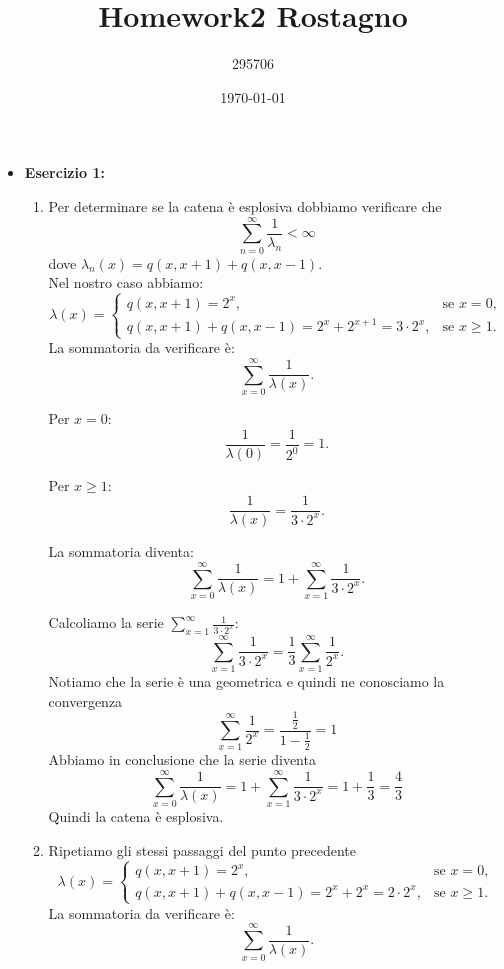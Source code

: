 \documentclass[a4paper,12pt]{article}
\begin{document}
	\title{\textbf{Homework2 Rostagno}}
	\author{295706}
	\date{\today}
	\maketitle
	
	\begin{itemize}
		\item \textbf{Esercizio 1: }
		\begin{enumerate}[label=\alph*)]
			\item Per determinare se la catena è esplosiva dobbiamo verificare che 
			\[
			\sum_{n=0}^\infty \frac{1}{\lambda_n} < \infty
			\]
			dove $\lambda_n(x)=q(x,x+1) + q(x,x-1)$.\\
			Nel nostro caso abbiamo:\\
			\[
			\lambda(x) =
			\begin{cases} 
				q(x, x+1) = 2^x, & \text{se } x = 0, \\ 
				q(x, x+1) + q(x, x-1) = 2^x + 2^{x+1} = 3 \cdot 2^x, & \text{se } x \geq 1.
			\end{cases}
			\]
			La sommatoria da verificare è:
			\[
			\sum_{x=0}^\infty \frac{1}{\lambda(x)}.
			\]
			
			Per \(x = 0\):
			\[
			\frac{1}{\lambda(0)} = \frac{1}{2^0} = 1.
			\]
			
			Per \(x \geq 1\):
			\[
			\frac{1}{\lambda(x)} = \frac{1}{3 \cdot 2^x}.
			\]
			
			La sommatoria diventa:
			\[
			\sum_{x=0}^\infty \frac{1}{\lambda(x)} = 1 + \sum_{x=1}^\infty \frac{1}{3 \cdot 2^x}.
			\]
			
			Calcoliamo la serie \(\sum_{x=1}^\infty \frac{1}{3 \cdot 2^x}\):
			\[
			\sum_{x=1}^\infty \frac{1}{3 \cdot 2^x} = \frac{1}{3} \sum_{x=1}^\infty \frac{1}{2^x}.
			\]
			Notiamo che la serie è una geometrica e quindi ne conosciamo la convergenza\\
			\[
			\sum_{x=1}^\infty \frac{1}{2^x} = \frac{\frac{1}{2}}{1-\frac{1}{2}}=1
			\]
			Abbiamo in conclusione che la serie diventa\\
			\[
			\sum_{x=0}^\infty \frac{1}{\lambda(x)} = 1 + \sum_{x=1}^\infty \frac{1}{3 \cdot 2^x}=1+\frac{1}{3}=\frac{4}{3}
			\]
			Quindi la catena è esplosiva.
			\item Ripetiamo gli stessi passaggi del punto precedente\\
			\[
			\lambda(x) =
			\begin{cases} 
				q(x, x+1) = 2^x, & \text{se } x = 0, \\ 
				q(x, x+1) + q(x, x-1) = 2^x + 2^{x} = 2 \cdot 2^x, & \text{se } x \geq 1.
			\end{cases}
			\]
			La sommatoria da verificare è:
			\[
			\sum_{x=0}^\infty \frac{1}{\lambda(x)}.
			\]
			

\end{enumerate}
\end{itemize}
\end{document}
